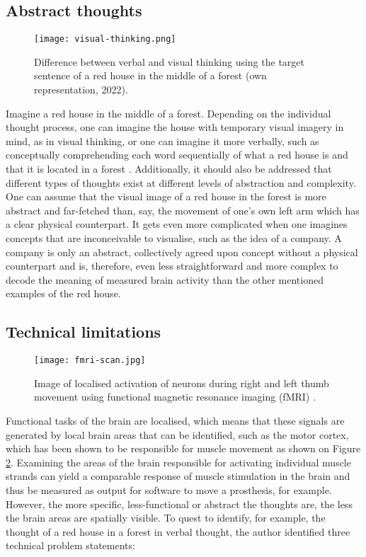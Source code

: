 \subsection{Abstract thoughts}
\label{chapter2-abstract-thoughts}

\begin{figure}[ht]
  \centering
  \texttt{[image: visual-thinking.png]}
  \caption{Difference between verbal and visual thinking using the target sentence of a red house in the middle of a forest (own representation, 2022).}
  \label{fig:visual-thinking}
\end{figure}

Imagine a red house in the middle of a forest. Depending on the individual thought process, one can imagine the house with temporary visual imagery in mind, as in visual thinking, or one can imagine it more verbally, such as conceptually comprehending each word sequentially of what a red house is and that it is located in a forest \citep{amit_asymmetrical_2017}. Additionally, it should also be addressed that different types of thoughts exist at different levels of abstraction and complexity. One can assume that the visual image of a red house in the forest is more abstract and far-fetched than, say, the movement of one's own left arm which has a clear physical counterpart. It gets even more complicated when one imagines concepts that are inconceivable to visualise, such as the idea of a company. A company is only an abstract, collectively agreed upon concept without a physical counterpart and is, therefore, even less straightforward and more complex to decode the meaning of measured brain activity than the other mentioned examples of the red house.

\subsection{Technical limitations}
\label{chapter2-technical-limitations}

\begin{figure}[ht]
  \centering
  \texttt{[image: fmri-scan.jpg]}
  \caption{Image of localised activation of neurons during right and left thumb movement using functional magnetic resonance imaging (fMRI) \citep{rashid_bilateral_2018}.}
  \label{fig:fmri-scan}
\end{figure}

Functional tasks of the brain are localised, which means that these signals are generated by local brain areas that can be identified, such as the motor cortex, which has been shown to be responsible for muscle movement as shown on Figure \ref{fig:fmri-scan}. Examining the areas of the brain responsible for activating individual muscle strands can yield a comparable response of muscle stimulation in the brain and thus be measured as output for software to move a prosthesis, for example. However, the more specific, less-functional or abstract the thoughts are, the less the brain areas are spatially visible. To quest to identify, for example, the thought of a red house in a forest in verbal thought, the author identified three technical problem statements:

